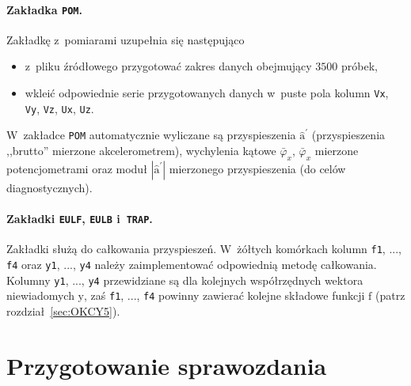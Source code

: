 \documentclass[paper=a4,DIV=12]{lpas}
\newcommand{\brm}[1]{\bm{\mathrm{#1}}}
\begin{document}
\paragraph{Zakładka \texttt{POM}.} Zakładkę z~pomiarami uzupełnia się
następująco
\begin{itemize}
  \item z~pliku źródłowego przygotować zakres danych obejmujący $3500$ próbek,
  \item wkleić odpowiednie serie przygotowanych danych w~puste pola kolumn
    \texttt{Vx}, \texttt{Vy}, \texttt{Vz}, \texttt{Ux}, \texttt{Uz}.
\end{itemize}
W~zakładce \texttt{POM} automatycznie wyliczane są przyspieszenia
$\hat{\brm{a}}^{\prime}$ (przyspieszenia ,,brutto'' mierzone akcelerometrem),
wychylenia kątowe $\bar{\varphi}_x$, $\bar{\varphi}_x$ mierzone potencjometrami
oraz moduł $\left|\hat{\brm{a}}^{\prime}\right|$ mierzonego przyspieszenia
(do celów diagnostycznych).

\paragraph{Zakładki \texttt{EULF}, \texttt{EULB} i~\texttt{TRAP}.} Zakładki
służą do całkowania przyspieszeń. W~żółtych komórkach kolumn \texttt{f1}, ...,
\texttt{f4} oraz \texttt{y1}, ..., \texttt{y4} należy zaimplementować
odpowiednią metodę całkowania. Kolumny \texttt{y1}, ..., \texttt{y4}
przewidziane są dla kolejnych współrzędnych wektora niewiadomych $\brm{y}$, zaś
\texttt{f1}, ..., \texttt{f4} powinny zawierać kolejne składowe funkcji
$\brm{f}$ (patrz rozdział~\ref{sec:OKCY5}).

\section{Przygotowanie sprawozdania}
\label{sec:GO0AP}
\end{document}
